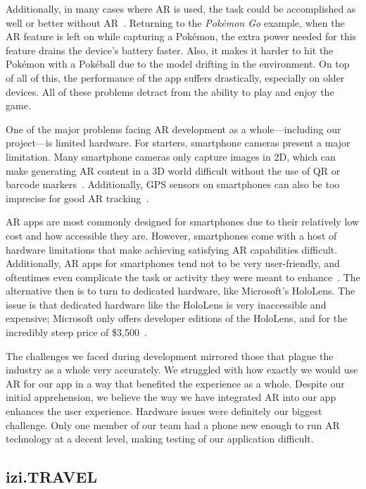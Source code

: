 \documentclass[a4paper, 10pt, american, titlepage]{article}
\begin{document}
Additionally, in many cases where AR is used, the task could be accomplished as
well or better without AR~\autocite{theappsolutions2018}. Returning to the
\textit{Pokémon Go} example, when the AR feature is left on while capturing a
Pokémon, the extra power needed for this feature drains the device's battery
faster. Also, it makes it harder to hit the Pokémon with a Pokéball due to the
model drifting in the environment. On top of all of this, the performance of
the app suffers drastically, especially on older devices. All of these problems
detract from the ability to play and enjoy the game.

One of the major problems facing AR development as a whole---including our
project---is limited hardware. For starters, smartphone cameras present a
major limitation. Many smartphone cameras only capture images in 2D, which can
make generating AR content in a 3D world difficult without the use of QR or
barcode markers~\autocite{geospatialworld2018}. Additionally, GPS sensors on
smartphones can also be too imprecise for good AR
tracking~\autocite{geospatialworld2018}.

AR apps are most commonly designed for smartphones due to their relatively low
cost and how accessible they are. However, smartphones come with a host of
hardware limitations that make achieving satisfying AR capabilities difficult.
Additionally, AR apps for smartphones tend not to be very user-friendly, and
oftentimes even complicate the task or activity they were meant to
enhance~\autocite{theappsolutions2018}.  The alternative then is to turn to
dedicated hardware, like Microsoft's HoloLens. The issue is that dedicated
hardware like the HoloLens is very inaccessible and expensive; Microsoft only
offers developer editions of the HoloLens, and for the incredibly steep price
of \$3,500~\autocite{microsoft2019}.

The challenges we faced during development mirrored those that plague the
industry as a whole very accurately. We struggled with how exactly we would use
AR for our app in a way that benefited the experience as a whole. Despite our
initial apprehension, we believe the way we have integrated AR into our app
enhances the user experience. Hardware issues were definitely our biggest
challenge. Only one member of our team had a phone new enough to run AR technology at a
decent level, making testing of our application difficult.

\subsection{izi.TRAVEL}
\label{sec:iziTravel}
\end{document}
